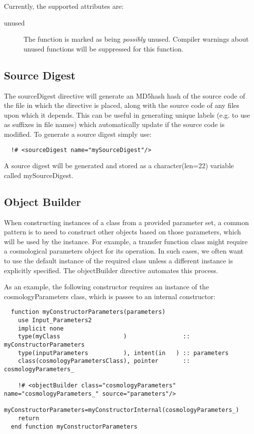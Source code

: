 Currently, the supported attributes are:
\begin{description}
\item[{\normalfont \ttfamily unused}] The function is marked as being \emph{possibly} unused. Compiler warnings about unused functions will be suppressed for this function.
\end{description}

\subsection{Source Digest}

The {\normalfont \ttfamily sourceDigest} directive will generate an \gls{MD5hash} hash of the source code of the file in which the directive is placed, along with the source code of any files upon which it depends. This can be useful in generating unique labels (e.g. to use as suffixes in file names) which automatically update if the source code is modified. To generate a source digest simply use:

\begin{lstlisting}
  !# <sourceDigest name="mySourceDigest"/>
\end{lstlisting}

A source digest will be generated and stored as a {\normalfont \ttfamily character(len=22)} variable called {\normalfont \ttfamily mySourceDigest}.

\subsection{Object Builder}

When constructing instances of a class from a provided parameter set, a common pattern is to need to construct other objects based on those parameters, which will be used by the instance. For example, a transfer function class might require a cosmological parameters object for its operation. In such cases, we often want to use the default instance of the required class unless a different instance is explicitly specified. The {\normalfont \ttfamily objectBuilder} directive automates this process.

As an example, the following constructor requires an instance of the {\normalfont \ttfamily cosmologyParameters} class, which is passes to an internal constructor:

\begin{lstlisting}  
  function myConstructorParameters(parameters)
    use Input_Parameters2
    implicit none
    type(myClass                  )                :: myConstructorParameters
    type(inputParameters          ), intent(in   ) :: parameters
    class(cosmologyParametersClass), pointer       :: cosmologyParameters_    

    !# <objectBuilder class="cosmologyParameters" name="cosmologyParameters_" source="parameters"/>
    myConstructorParameters=myConstructorInternal(cosmologyParameters_)
    return
  end function myConstructorParameters
\end{lstlisting}

